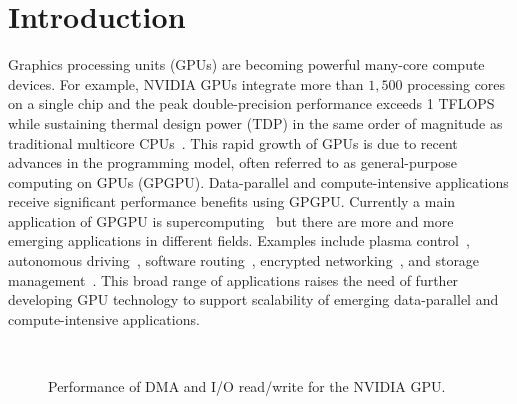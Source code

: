 \section{Introduction}
\label{sec:introduction}

Graphics processing units (GPUs) are becoming powerful many-core compute
devices.
For example, NVIDIA GPUs integrate more than $1,500$ processing cores on
a single chip and the peak double-precision performance exceeds 1
TFLOPS while sustaining thermal design power (TDP) in the same order of
magnitude as traditional multicore CPUs~\cite{NVIDIA_Kepler}. 
This rapid growth of GPUs is due to recent advances in the
programming model, often referred to as general-purpose computing on
GPUs (GPGPU).
Data-parallel and compute-intensive applications receive significant
performance benefits using GPGPU.
Currently a main application of GPGPU is supercomputing~\cite{TOP500}
but there are more and more emerging applications in different fields.
Examples include plasma control~\cite{Kato_ICCPS13}, autonomous
driving~\cite{McNaughton_ICRA11}, software routing~\cite{Han_SIGCOMM10},
encrypted networking~\cite{Jang_NSDI11}, and storage
management~\cite{Bhatotia_FAST12, Gharaibeh_HPDC10, Kato_ATC12,
Sun_SYSTOR12}.
This broad range of applications raises the need of further developing
GPU technology to support scalability of emerging data-parallel and
compute-intensive applications.

\begin{figure}[!t]
 \centering
 \\
 \caption{Performance of DMA and I/O read/write for the NVIDIA GPU.}
 \label{fig:intro_data_transfer}
\end{figure}

